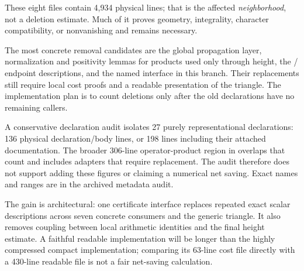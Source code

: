 These eight files contain 4,934 physical lines; that is the affected
\emph{neighborhood}, not a deletion estimate. Much of it proves geometry,
integrality, character compatibility, or nonvanishing and remains necessary.

The most concrete removal candidates are the global
 propagation layer, normalization and positivity
lemmas for products used only through height, the
/ endpoint descriptions, and the named
 interface in this branch. Their replacements still
require local cost proofs and a readable presentation of the triangle.
The implementation plan is to count deletions only after the old
declarations have no remaining callers.

A conservative declaration audit isolates 27 purely representational
declarations: 136 physical declaration/body lines, or 198 lines including
their attached documentation. The broader 306-line operator-product
region in  overlaps that count and includes adapters
that require replacement. The audit therefore does not support adding
these figures or claiming a numerical net saving. Exact names and
ranges are in the archived metadata audit.

The gain is architectural: one certificate interface replaces repeated
exact scalar descriptions across seven concrete consumers and the generic
triangle. It also removes coupling between local arithmetic identities
and the final height estimate. A faithful readable implementation will
be longer than the highly compressed compact implementation; comparing
its 63-line cost file directly with a 430-line readable file is not a fair
net-saving calculation.
